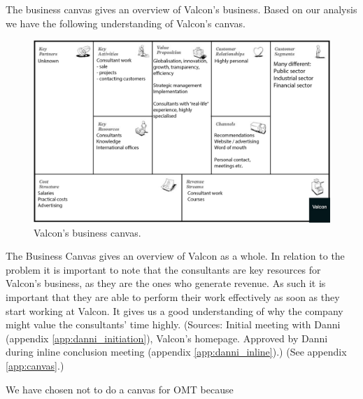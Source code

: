 The business canvas gives an overview of Valcon's business.
Based on our analysis we have the following understanding of Valcon's canvas.
\begin{figure}[!htp]
\includegraphics[width=\textwidth]{inline/business-model-canvas.png}
\caption{Valcon's business canvas.}
\label{fig:canvas}
\end{figure}

The Business Canvas gives an overview of Valcon as a whole. In relation to the problem it is important to note that the consultants are key resources for Valcon's business, as they are the ones who generate revenue.
As such it is important that they are able to perform their work effectively as soon as they start working at Valcon. It gives us a good understanding of why the company might value the consultants' time highly. (Sources: Initial meeting with Danni (appendix \ref{app:danni_initiation}), Valcon's homepage. Approved by Danni during inline conclusion meeting (appendix \ref{app:danni_inline}).) (See appendix \ref{app:canvas}.)

We have chosen not to do a canvas for OMT because 